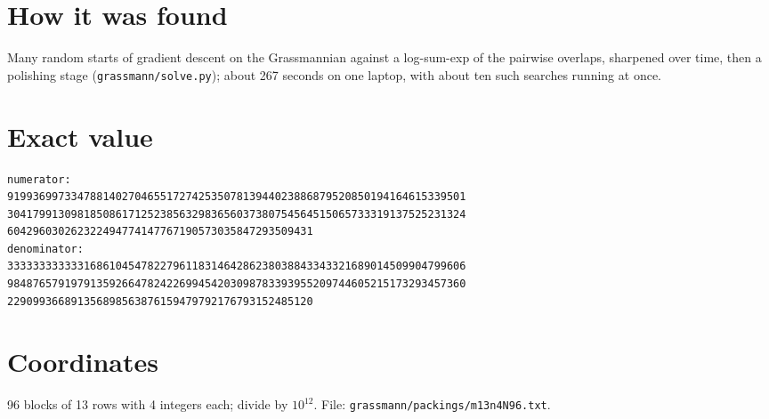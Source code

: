 \documentclass[11pt,a4paper]{article}
\begin{document}
\section{How it was found}
Many random starts of gradient descent on the Grassmannian against a log-sum-exp of the pairwise overlaps, sharpened over time, then a polishing stage (\texttt{grassmann/solve.py}); about 267 seconds on one laptop, with about ten such searches running at once.


\appendix
\section{Exact value}
{\small
\begin{verbatim}
numerator:
919936997334788140270465517274253507813944023886879520850194164615339501
304179913098185086171252385632983656037380754564515065733319137525231324
604296030262322494774147767190573035847293509431
denominator:
333333333333168610454782279611831464286238038843343321689014509904799606
984876579197913592664782422699454203098783393955209744605215173293457360
229099366891356898563876159479792176793152485120
\end{verbatim}}

\section{Coordinates}
96 blocks of 13 rows with 4 integers each; divide by $10^{12}$. File: \texttt{grassmann/packings/m13n4N96.txt}.
{\tiny
\begin{multicols}{3}
\end{multicols}}
\end{document}
